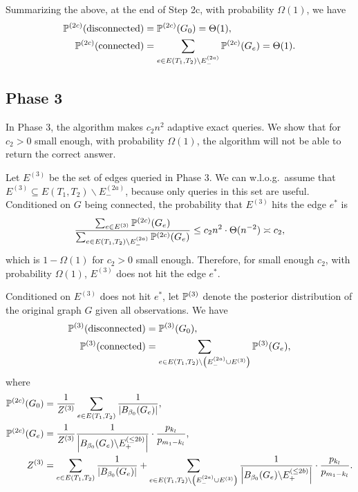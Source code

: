 Summarizing the above, at the end of Step 2c, with probability $\Omega(1)$, we have
\begin{align*}
  \mathbb{P}^{(2c)}(\text{disconnected}) &= \mathbb{P}^{(2c)}(G_0) = \Theta(1), \\
  \mathbb{P}^{(2c)}(\text{connected}) &= \sum_{e\in E(T_1,T_2) \backslash E^{(2a)}_-} \mathbb{P}^{(2c)}(G_e) = \Theta(1).
\end{align*}

\subsection{Phase 3} \label{sec:conn:phase-3}
In Phase 3, the algorithm makes $c_2 n^2$ adaptive exact queries.
We show that for $c_2>0$ small enough, with probability $\Omega(1)$, the algorithm will not be able to return the correct answer.

Let $E^{(3)}$ be the set of edges queried in Phase 3.
We can w.l.o.g.~assume that $E^{(3)} \subseteq E(T_1,T_2) \backslash E^{(2a)}_-$, because only queries in this set are useful.
Conditioned on $G$ being connected, the probability that $E^{(3)}$ hits the edge $e^*$ is
\begin{align*}
  \frac{\sum_{e\in E^{(3)}} \mathbb{P}^{(2c)}(G_e)}{\sum_{e\in E(T_1,T_2) \backslash E^{(2a)}_-} \mathbb{P}^{(2c)}(G_e)}
  \le c_2 n^2 \cdot \Theta(n^{-2}) \asymp c_2,
\end{align*}
which is $1-\Omega(1)$ for $c_2>0$ small enough.
Therefore, for small enough $c_2$, with probability $\Omega(1)$, $E^{(3)}$ does not hit the edge $e^*$.

Conditioned on $E^{(3)}$ does not hit $e^*$, let $\mathbb{P}^{(3)}$ denote the posterior distribution of the original graph $G$ given all observations.
We have
\begin{align*}
  \mathbb{P}^{(3)}(\text{disconnected}) &= \mathbb{P}^{(3)}(G_0),\\
  \mathbb{P}^{(3)}(\text{connected}) &= \sum_{e\in E(T_1,T_2) \backslash \left(E^{(2a)}_-\cup E^{(3)}\right)} \mathbb{P}^{(3)}(G_e),
\end{align*}
where
\begin{align*}
  \mathbb{P}^{(2c)}(G_0) &=\frac 1{Z^{(3)}} \sum_{e\in E(T_1,T_2)} \frac 1{\left| B_{\beta_0}(G_e) \right|}, \\
  \mathbb{P}^{(2c)}(G_e) &=\frac 1{Z^{(3)}} \frac 1{\left| B_{\beta_0}(G_e) \backslash E^{(\le 2b)}_+ \right|} \cdot \frac{p_{k_l}}{p_{m_1-k_l}},\\
  Z^{(3)} &= \sum_{e\in E(T_1,T_2)} \frac 1{\left| B_{\beta_0}(G_e) \right|} + \sum_{e\in E(T_1,T_2) \backslash \left(E^{(2a)}_-\cup E^{(3)}\right)} \frac 1{\left| B_{\beta_0}(G_e) \backslash E^{(\le 2b)}_+ \right|} \cdot \frac{p_{k_l}}{p_{m_1-k_l}}.
\end{align*}

